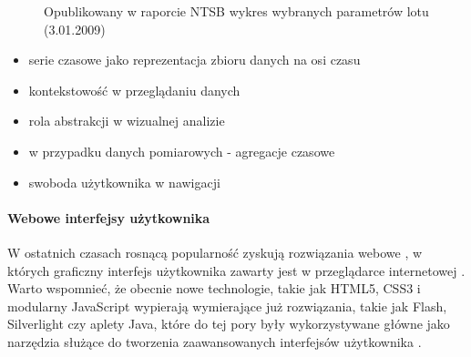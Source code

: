 \begin{figure}[H]
	\centering
	\setlength\fboxsep{5pt}
	\setlength\fboxrule{0.5pt}
	\caption{Opublikowany w raporcie NTSB wykres wybranych parametrów lotu (3.01.2009)}
	\label{fig:ntsb_plot}
\end{figure}


\begin{itemize}
	\item serie czasowe jako reprezentacja zbioru danych na osi czasu
	\item kontekstowość w przeglądaniu danych
	\item rola abstrakcji w wizualnej analizie
	\item w przypadku danych pomiarowych - agregacje czasowe
	\item swoboda użytkownika w nawigacji
\end{itemize}


\paragraph{Webowe interfejsy użytkownika}

W ostatnich czasach rosnącą popularność zyskują rozwiązania webowe \cite{dziennik-internautow}, w których graficzny interfejs użytkownika zawarty jest w przeglądarce internetowej \cite{what-is-web-app}.
Warto wspomnieć, że obecnie nowe technologie, takie jak HTML5, CSS3 i modularny JavaScript wypierają wymierające już rozwiązania, takie jak Flash, Silverlight czy aplety Java, które do tej pory były wykorzystywane główne jako narzędzia służące do tworzenia zaawansowanych interfejsów użytkownika \cite{jobs2010thoughts}.


